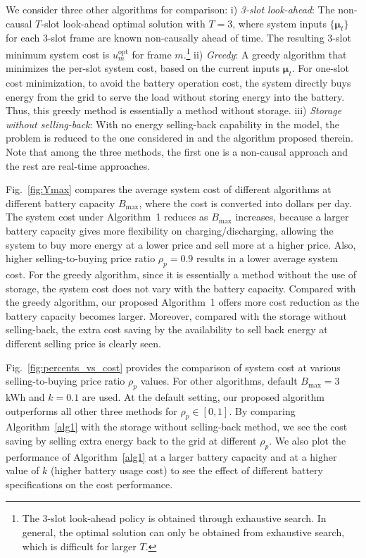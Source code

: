 \documentclass[journal]{IEEEtran}
\def\mubf{\boldsymbol \mu }
\begin{document}
We consider three other algorithms for comparison:
i) \emph{3-slot look-ahead}: The non-causal $T$-slot look-ahead optimal solution with $T=3$, where system inputs $\{\mubf_t\}$ for each 3-slot frame are known non-causally ahead of time. The resulting 3-slot minimum system cost is $u_m^\textrm{opt}$ for frame $m$.\footnote{The 3-slot look-ahead policy is obtained through exhaustive search. In general, the optimal solution can only be obtained from exhaustive search, which is difficult for larger $T$.}
ii) \emph{Greedy}: A greedy algorithm that minimizes the per-slot system cost, based on the current inputs $\mubf_t$. For one-slot cost minimization, to avoid the battery operation cost, the system directly buys energy from the grid to serve the load without storing energy into the battery. Thus, this greedy method is essentially a method without storage.
iii) \emph{Storage without selling-back}: With no energy selling-back capability in the model, the problem is reduced to the one considered in \cite{Li&Dong:JSAC15} and the algorithm proposed therein. Note that among the three methods, the first one is a non-causal approach and the rest   are real-time approaches.

 Fig.~\ref{fig:Ymax} compares  the average system cost of different algorithms at different  battery capacity $B_{\max}$, where
the  cost is converted into dollars per day. The system cost under Algorithm~1 reduces as $B_{\max}$ increases, because a larger battery capacity gives more flexibility on charging/discharging, allowing the system to buy more energy at a lower  price and sell more at a higher  price.
Also,  higher selling-to-buying price ratio $\rho_p=0.9$ results in a lower average system cost. For the  greedy algorithm, since it is essentially a method without the use of storage, the system cost does not vary with the battery capacity. Compared with the greedy algorithm, our proposed  Algorithm~1 offers more cost reduction as the battery capacity becomes larger.
Moreover, compared with the storage without selling-back, the extra cost saving by the availability to sell back energy at different selling price is clearly seen.

Fig.~\ref{fig:percents_vs_cost} provides the comparison of system cost  at various selling-to-buying price ratio $\rho_p$ values. For other algorithms, default $B_{\max}=3$ kWh and $k=0.1$ are used.
At the default setting, our proposed algorithm outperforms all other three methods for $\rho_p\in [0,1]$. By comparing Algorithm~\ref{alg1} with the storage without selling-back method, we see the cost saving by selling extra energy back to the grid   at different $\rho_p$. We also plot the performance of Algorithm~\ref{alg1} at a larger battery capacity and at a higher value of $k$ (higher battery usage cost) to see the effect of different battery specifications on the cost performance.
\end{document}
